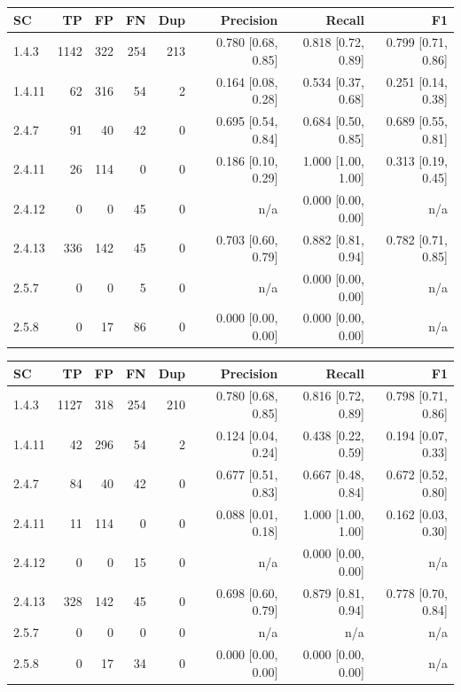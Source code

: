 \begin{tabular}{lrrrrrrr}
\hline
SC & TP & FP & FN & Dup & Precision & Recall & F1 \\
\hline
1.4.3 & 1142 & 322 & 254 & 213 & 0.780 [0.68, 0.85] & 0.818 [0.72, 0.89] & 0.799 [0.71, 0.86] \\
1.4.11 & 62 & 316 & 54 & 2 & 0.164 [0.08, 0.28] & 0.534 [0.37, 0.68] & 0.251 [0.14, 0.38] \\
2.4.7 & 91 & 40 & 42 & 0 & 0.695 [0.54, 0.84] & 0.684 [0.50, 0.85] & 0.689 [0.55, 0.81] \\
2.4.11 & 26 & 114 & 0 & 0 & 0.186 [0.10, 0.29] & 1.000 [1.00, 1.00] & 0.313 [0.19, 0.45] \\
2.4.12 & 0 & 0 & 45 & 0 & n/a & 0.000 [0.00, 0.00] & n/a \\
2.4.13 & 336 & 142 & 45 & 0 & 0.703 [0.60, 0.79] & 0.882 [0.81, 0.94] & 0.782 [0.71, 0.85] \\
2.5.7 & 0 & 0 & 5 & 0 & n/a & 0.000 [0.00, 0.00] & n/a \\
2.5.8 & 0 & 17 & 86 & 0 & 0.000 [0.00, 0.00] & 0.000 [0.00, 0.00] & n/a \\
\hline
\end{tabular}

\begin{tabular}{lrrrrrrr}
\hline
SC & TP & FP & FN & Dup & Precision & Recall & F1 \\
\hline
1.4.3 & 1127 & 318 & 254 & 210 & 0.780 [0.68, 0.85] & 0.816 [0.72, 0.89] & 0.798 [0.71, 0.86] \\
1.4.11 & 42 & 296 & 54 & 2 & 0.124 [0.04, 0.24] & 0.438 [0.22, 0.59] & 0.194 [0.07, 0.33] \\
2.4.7 & 84 & 40 & 42 & 0 & 0.677 [0.51, 0.83] & 0.667 [0.48, 0.84] & 0.672 [0.52, 0.80] \\
2.4.11 & 11 & 114 & 0 & 0 & 0.088 [0.01, 0.18] & 1.000 [1.00, 1.00] & 0.162 [0.03, 0.30] \\
2.4.12 & 0 & 0 & 15 & 0 & n/a & 0.000 [0.00, 0.00] & n/a \\
2.4.13 & 328 & 142 & 45 & 0 & 0.698 [0.60, 0.79] & 0.879 [0.81, 0.94] & 0.778 [0.70, 0.84] \\
2.5.7 & 0 & 0 & 0 & 0 & n/a & n/a & n/a \\
2.5.8 & 0 & 17 & 34 & 0 & 0.000 [0.00, 0.00] & 0.000 [0.00, 0.00] & n/a \\
\hline
\end{tabular}

